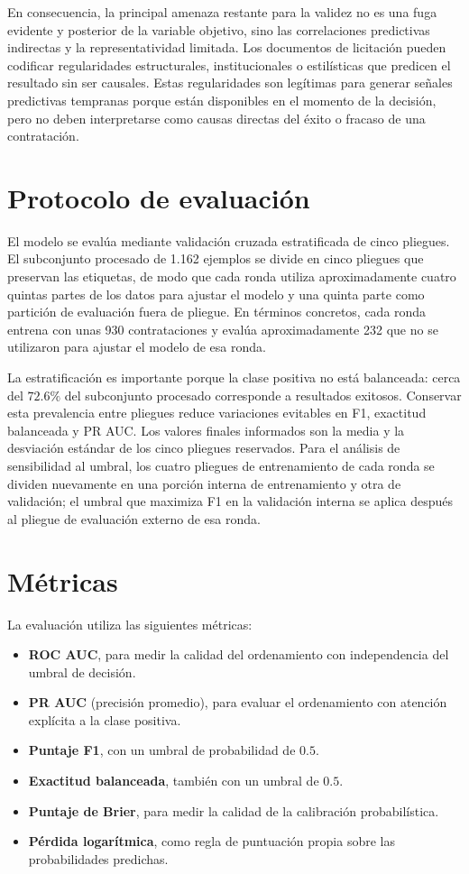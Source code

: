 En consecuencia, la principal amenaza restante para la validez no es una fuga evidente y posterior de la variable objetivo, sino las correlaciones predictivas indirectas y la representatividad limitada. Los documentos de licitación pueden codificar regularidades estructurales, institucionales o estilísticas que predicen el resultado sin ser causales. Estas regularidades son legítimas para generar señales predictivas tempranas porque están disponibles en el momento de la decisión, pero no deben interpretarse como causas directas del éxito o fracaso de una contratación.

\section{Protocolo de evaluación}
El modelo se evalúa mediante validación cruzada estratificada de cinco pliegues. El subconjunto procesado de 1.162 ejemplos se divide en cinco pliegues que preservan las etiquetas, de modo que cada ronda utiliza aproximadamente cuatro quintas partes de los datos para ajustar el modelo y una quinta parte como partición de evaluación fuera de pliegue. En términos concretos, cada ronda entrena con unas 930 contrataciones y evalúa aproximadamente 232 que no se utilizaron para ajustar el modelo de esa ronda.

La estratificación es importante porque la clase positiva no está balanceada: cerca del $72.6\%$ del subconjunto procesado corresponde a resultados exitosos. Conservar esta prevalencia entre pliegues reduce variaciones evitables en F1, exactitud balanceada y PR AUC. Los valores finales informados son la media y la desviación estándar de los cinco pliegues reservados. Para el análisis de sensibilidad al umbral, los cuatro pliegues de entrenamiento de cada ronda se dividen nuevamente en una porción interna de entrenamiento y otra de validación; el umbral que maximiza F1 en la validación interna se aplica después al pliegue de evaluación externo de esa ronda.

\section{Métricas}
La evaluación utiliza las siguientes métricas:

\begin{itemize}
  \item \textbf{ROC AUC}, para medir la calidad del ordenamiento con independencia del umbral de decisión.
  \item \textbf{PR AUC} (precisión promedio), para evaluar el ordenamiento con atención explícita a la clase positiva.
  \item \textbf{Puntaje F1}, con un umbral de probabilidad de $0.5$.
  \item \textbf{Exactitud balanceada}, también con un umbral de $0.5$.
  \item \textbf{Puntaje de Brier}, para medir la calidad de la calibración probabilística.
  \item \textbf{Pérdida logarítmica}, como regla de puntuación propia sobre las probabilidades predichas.
\end{itemize}

